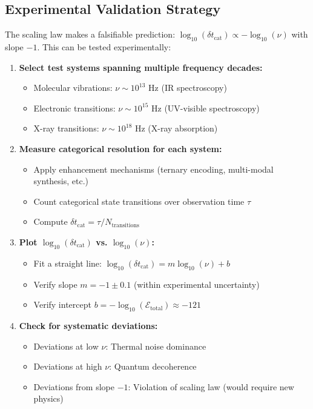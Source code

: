 \documentclass[twocolumn,10pt]{article}
\theoremstyle{remark}
\begin{document}
\subsection{Experimental Validation Strategy}

The scaling law makes a falsifiable prediction: $\log_{10}(\delta t_{\text{cat}}) \propto -\log_{10}(\nu)$ with slope $-1$. This can be tested experimentally:

\begin{enumerate}
    \item \textbf{Select test systems spanning multiple frequency decades:}
    \begin{itemize}
        \item Molecular vibrations: $\nu \sim 10^{13}$ Hz (IR spectroscopy)
        \item Electronic transitions: $\nu \sim 10^{15}$ Hz (UV-visible spectroscopy)
        \item X-ray transitions: $\nu \sim 10^{18}$ Hz (X-ray absorption)
    \end{itemize}
    
    \item \textbf{Measure categorical resolution for each system:}
    \begin{itemize}
        \item Apply enhancement mechanisms (ternary encoding, multi-modal synthesis, etc.)
        \item Count categorical state transitions over observation time $\tau$
        \item Compute $\delta t_{\text{cat}} = \tau / N_{\text{transitions}}$
    \end{itemize}
    
    \item \textbf{Plot $\log_{10}(\delta t_{\text{cat}})$ vs. $\log_{10}(\nu)$:}
    \begin{itemize}
        \item Fit a straight line: $\log_{10}(\delta t_{\text{cat}}) = m \log_{10}(\nu) + b$
        \item Verify slope $m = -1 \pm 0.1$ (within experimental uncertainty)
        \item Verify intercept $b = -\log_{10}(\mathcal{E}_{\text{total}}) \approx -121$
    \end{itemize}
    
    \item \textbf{Check for systematic deviations:}
    \begin{itemize}
        \item Deviations at low $\nu$: Thermal noise dominance
        \item Deviations at high $\nu$: Quantum decoherence
        \item Deviations from slope $-1$: Violation of scaling law (would require new physics)
    \end{itemize}
\end{enumerate}
\end{document}
